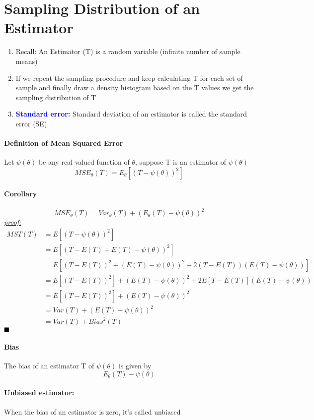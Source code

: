 \documentclass[11pt]{article}
\newcommand{\tb}[1]{\textbf{#1}}
\newcommand{\proof}[0]{\textit{\underline{proof: }}}
\newcommand{\qed}[0]{$\hfill\blacksquare$}
\begin{document}
\section{Sampling Distribution of an Estimator}
\begin{enumerate}
	\item Recall: An Estimator (T) is a random variable (infinite number of sample means)
	\item If we repeat the sampling procedure and keep calculating T for each set of sample and finally draw a density histogram based on the T values we get the sampling distribution of T
	\item \tb{\textcolor{blue}{Standard error}:} Standard deviation of an estimator is called the standard error (SE)
\end{enumerate}

\paragraph{Definition of Mean Squared Error}
Let $\psi(\theta)$ be any real valued function of $\theta$, suppose T is an estimator of $\psi(\theta)$
$$MSE_\theta(T) = E_\theta[(T - \psi(\theta))^2]$$
\paragraph{Corollary}
$$MSE_\theta(T) = Var_\theta(T) + (E_\theta(T) - \psi(\theta))^2$$
\proof
\begin{align*}
	MST(T) &= E[(T - \psi({\theta}))^2] \\
	&= E[(T - E(T) + E(T) - \psi({\theta}))^2] \\
	&= E[(T - E(T))^2 + (E(T) - \psi({\theta}))^2 + 2(T-E(T))(E(T)-\psi({\theta}))] \\
	&= E[(T - E(T))^2] + (E(T) - \psi({\theta}))^2 +  2E[T-E(T)](E(T)-\psi({\theta}))\\
	&= E[(T - E(T))^2] + (E(T) - \psi({\theta}))^2 \tag{Since $E[T-E(T)] =  E(T)-E(T) = 0$}\\
	&= Var(T) + (E(T) - \psi({\theta}))^2\\
	&= Var(T) + Bias^2(T)
\end{align*}\qed

\paragraph{Bias} The bias of an estimator T of $\psi(\theta)$ is given by $$E_\theta(T) - \psi(\theta)$$
\paragraph{Unbiased estimator:} When the bias of an estimator is zero, it's called unbiased
\end{document}
